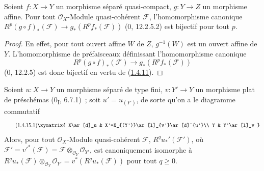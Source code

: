 \begin{proposition}[1.4.14]
\label{III.1.4.14-fr}
Soient $f:X\to Y$ un morphisme séparé quasi-compact, $g:Y\to Z$ un
morphisme affine. Pour tout $\mathcal O_X$-Module quasi-cohérent
$\mathcal F$, l'homomorphisme canonique
$R^p(g\circ f)_*(\mathcal F)\to g_*(R^pf_*(\mathcal F))$ (0, 12.2.5.2) est
bijectif pour tout $p$.
\end{proposition}

\begin{proof}
En effet, pour tout ouvert affine $W$ de $Z$, $g^{-1}(W)$ est un ouvert
affine de $Y$. L'homomorphisme de préfaisceaux définissant l'homomorphisme
canonique
\[
R^p(g\circ f)_*(\mathcal F)\longrightarrow g_*(R^pf_*(\mathcal F))
\]
(0, 12.2.5) est donc bijectif en vertu de
(\hyperref[III.1.4.11-fr]{1.4.11}).
\end{proof}

\begin{proposition}[1.4.15]
\label{III.1.4.15-fr}
Soient $u:X\to Y$ un morphisme séparé de type fini, $v:Y'\to Y$ un
morphisme plat de préschémas (0\textsubscript{I}, 6.7.1)~; soit
$u'=u_{(Y')}$, de sorte qu'on a le diagramme commutatif
\begin{equation}
\label{III.1.4.15.1-fr}
\tag{1.4.15.1}
\xymatrix{
X\ar[d]_u & X'=X_{(Y')}\ar[l]_{v'}\ar[d]^{u'}\\
Y & Y'\ar[l]_v
}
\end{equation}
Alors, pour tout $\mathcal O_X$-Module quasi-cohérent $\mathcal F$,
$R^qu_*'(\mathcal F')$, où
$\mathcal F'=v'^*(\mathcal F)=\mathcal F\otimes_{\mathcal O_Y}\mathcal O_{Y'}$,
est canoniquement isomorphe à
$R^qu_*(\mathcal F)\otimes_{\mathcal O_Y}\mathcal O_{Y'}
=v^*(R^qu_*(\mathcal F))$ pour tout $q\geq0$.
\end{proposition}

